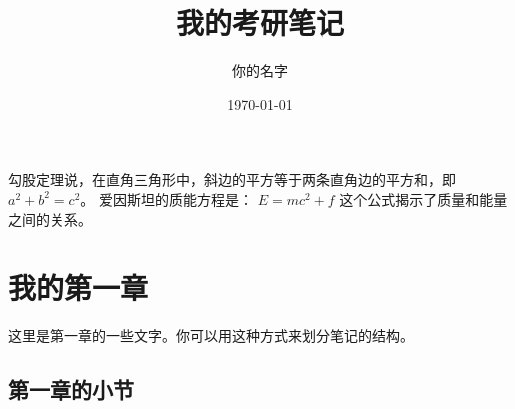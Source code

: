 \documentclass[UTF8]{ctexart}
\title{我的考研笔记}
\author{你的名字} %
\date{\today}
\begin{document}
\maketitle %

勾股定理说，在直角三角形中，斜边的平方等于两条直角边的平方和，即 $a^2 + b^2 = c^2$。
爱因斯坦的质能方程是：
$ E=mc^2+f $
这个公式揭示了质量和能量之间的关系。

\section{我的第一章} %
这里是第一章的一些文字。你可以用这种方式来划分笔记的结构。

\subsection{第一章的小节} %
\end{document}
